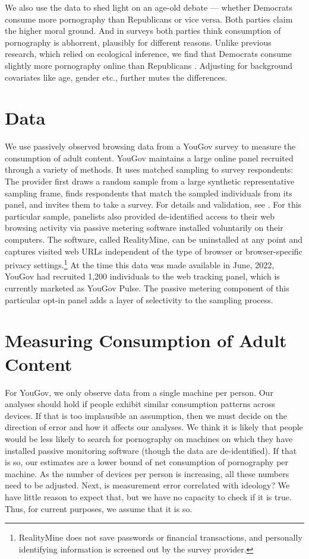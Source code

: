 \documentclass[12pt, letterpaper]{article}
\begin{document}
We also use the data to shed light on an age-old debate --- whether Democrats consume more pornography than Republicans or vice versa. Both parties claim the higher moral ground. And in surveys both parties think consumption of pornography is abhorrent, plausibly for different reasons. Unlike previous research, which relied on ecological inference, we find that Democrats consume slightly more pornography online than Republicans \citep{macinnis2015american, edelman2009markets}. Adjusting for background covariates like age, gender etc., further mutes the differences.

\section*{Data}
We use passively observed browsing data from a YouGov survey to measure the consumption of adult content. YouGov maintains a large online panel recruited through a variety of methods. It uses matched sampling to survey respondents: The provider first draws a random sample from a large synthetic representative sampling frame, finds respondents that match the sampled individuals from its panel, and invites them to take a survey. For details and validation, see \citet{rivers2009}. For this particular sample, panelists also provided de-identified access to their web browsing activity via passive metering software installed voluntarily on their computers. The software, called RealityMine, can be uninstalled at any point and captures visited web URLs independent of the type of browser or browser-specific privacy settings.\footnote{RealityMine does not save passwords or financial transactions, and personally identifying information is screened out by the survey provider.} At the time this data was made available in June, 2022, YouGov had recruited 1,200 individuals to the web tracking panel, which is currently marketed as YouGov Pulse. The passive metering component of this particular opt-in panel adds a layer of selectivity to the sampling process. 

\section*{Measuring Consumption of Adult Content}
For YouGov, we only observe data from a single machine per person. Our analyses should hold if people exhibit similar consumption patterns across devices. If that is too implausible an assumption, then we must decide on the direction of error and how it affects our analyses. We think it is likely that people would be less likely to search for pornography on machines on which they have installed passive monitoring software (though the data are de-identified). If that is so, our estimates are a lower bound of net consumption of pornography per machine. As the number of devices per person is increasing, all these numbers need to be adjusted. Next, is measurement error correlated with ideology? We have little reason to expect that, but we have no capacity to check if it is true. Thus, for current purposes, we assume that it is so.  
\end{document}
